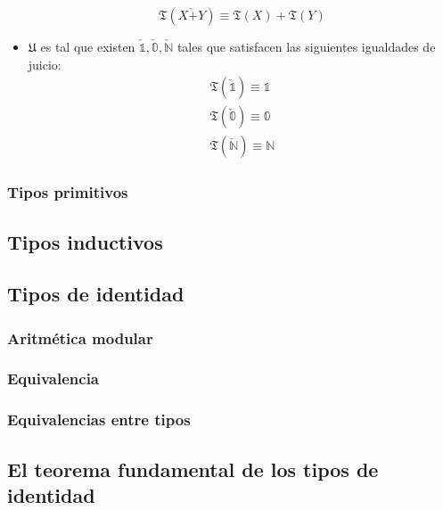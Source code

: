 \documentclass{article}
\begin{document}
\begin{definition}[Universo]
\begin{itemize}
                $$
                    \mathfrak{T}(X \check{+} Y) \equiv 
                        \mathfrak{T}(X) + \mathfrak{T}(Y)
                $$
                \item $\mathfrak{U}$ es tal que existen $\check{\mathbb{1}}, 
                \check{\mathbb{0}}, \check{\mathbb{N}}$ tales que satisfacen las 
                siguientes igualdades de juicio:
                \begin{align*}
                    \mathfrak{T}(\check{\mathbb{1}}) \equiv \mathbb{1}\\
                    \mathfrak{T}(\check{\mathbb{0}}) \equiv \mathbb{0}\\
                    \mathfrak{T}(\check{\mathbb{N}}) \equiv \mathbb{N}
                \end{align*}
            \end{itemize}
            
        \end{definition}

        
        
        
    \subsubsection{Tipos primitivos}

\subsection{Tipos inductivos}

\subsection{Tipos de identidad}

\subsubsection{Aritmética modular}

\subsubsection{Equivalencia}
    \subsubsection{Equivalencias entre tipos}
\subsection{El teorema fundamental de los tipos de identidad}
\end{document}
